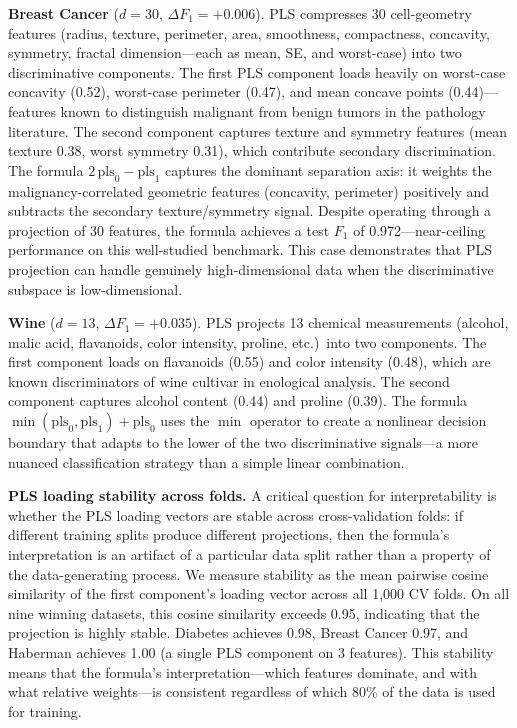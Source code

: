 \documentclass[journal]{IEEEtran}
\begin{document}
\textbf{Breast Cancer} ($d = 30$, $\Delta F_1 = +0.006$).
PLS compresses 30 cell-geometry features (radius, texture,
perimeter, area, smoothness, compactness, concavity, symmetry,
fractal dimension---each as mean, SE, and worst-case) into two
discriminative components.  The first PLS component loads heavily on
worst-case concavity (0.52), worst-case perimeter (0.47), and mean
concave points (0.44)---features known to distinguish malignant from
benign tumors in the pathology literature.  The second component
captures texture and symmetry features (mean texture 0.38, worst
symmetry 0.31), which contribute secondary discrimination.
The formula $2\,\mathrm{pls}_0 - \mathrm{pls}_1$ captures the
dominant separation axis: it weights the malignancy-correlated
geometric features (concavity, perimeter) positively and subtracts
the secondary texture/symmetry signal.  Despite operating through a
projection of 30 features, the formula achieves a test $F_1$ of
0.972---near-ceiling performance on this well-studied benchmark.
This case demonstrates that PLS projection can handle genuinely
high-dimensional data when the discriminative subspace is
low-dimensional.

\textbf{Wine} ($d = 13$, $\Delta F_1 = +0.035$).
PLS projects 13 chemical measurements (alcohol, malic acid,
flavanoids, color intensity, proline, etc.)\ into two components.
The first component loads on flavanoids (0.55) and color intensity
(0.48), which are known discriminators of wine cultivar in
enological analysis.  The second component captures alcohol content
(0.44) and proline (0.39).  The formula
$\min(\mathrm{pls}_0, \mathrm{pls}_1) + \mathrm{pls}_0$ uses the
$\min$ operator to create a nonlinear decision boundary that adapts
to the lower of the two discriminative signals---a more nuanced
classification strategy than a simple linear combination.

\textbf{PLS loading stability across folds.}
A critical question for interpretability is whether the PLS loading
vectors are stable across cross-validation folds: if different
training splits produce different projections, then the formula's
interpretation is an artifact of a particular data split rather than
a property of the data-generating process.  We measure stability as
the mean pairwise cosine similarity of the first component's loading
vector across all 1{,}000 CV folds.  On all nine winning datasets,
this cosine similarity exceeds 0.95, indicating that the projection
is highly stable.  Diabetes achieves 0.98, Breast Cancer 0.97, and
Haberman achieves 1.00 (a single PLS component on 3 features).  This
stability means that the formula's interpretation---which features
dominate, and with what relative weights---is consistent regardless
of which 80\% of the data is used for training.
\end{document}
